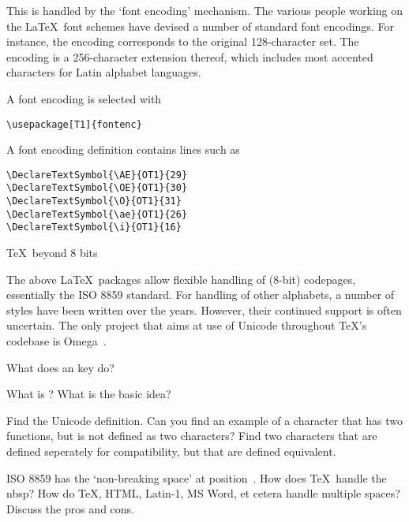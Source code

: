 This is handled by the `font encoding'
mechanism.
The various people working on the \LaTeX\ font schemes have devised a
number of standard font encodings. For instance, the
 encoding corresponds to the original 128-character
set. The  encoding is a 256-character extension
thereof, which includes most accented characters for Latin alphabet
languages.

A font encoding is selected with
\begin{verbatim}
\usepackage[T1]{fontenc}
\end{verbatim}
A font encoding definition contains lines such as
\begin{verbatim}
\DeclareTextSymbol{\AE}{OT1}{29}
\DeclareTextSymbol{\OE}{OT1}{30}
\DeclareTextSymbol{\O}{OT1}{31}
\DeclareTextSymbol{\ae}{OT1}{26}
\DeclareTextSymbol{\i}{OT1}{16}
\end{verbatim}

 {\TeX\ beyond 8 bits}

The above \LaTeX\ packages allow flexible handling of (8-bit)
codepages, essentially the ISO 8859 standard. For 
handling of other alphabets, a number of styles have been written over
the years. However, their continued support is often uncertain. The
only project that aims at use of Unicode throughout \TeX's codebase is
Omega~\cite{omega}.


\begin{594exercise}
What does an  key do?
\end{594exercise}

\begin{594exercise}
What is \ebcdic? What is the basic idea?
\end{594exercise}

\begin{594exercise}
Find the Unicode definition. Can you find an example of a
character that has two functions, but is not defined as two
characters? Find two characters that are defined seperately for
compatibility, but that are defined equivalent.
\end{594exercise}

\begin{594exercise}
ISO 8859 has the `non-breaking space' at position~. How
does \TeX\ handle the nbsp? How do \TeX, HTML, Latin-1, MS Word, et
cetera handle multiple spaces? Discuss the pros and cons.  
\end{594exercise}


